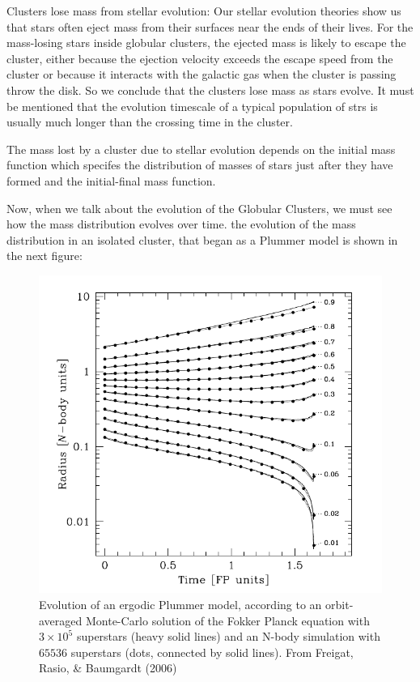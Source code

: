 Clusters lose mass from stellar evolution: Our stellar evolution theories show us that stars often eject mass from their surfaces near the ends of their lives. For the mass-losing stars inside globular clusters, the ejected mass is likely to escape the cluster, either because the ejection velocity exceeds the escape speed from the cluster or because it interacts with the galactic gas when the cluster is passing throw the disk. So we conclude that the clusters lose mass as stars evolve. It must be mentioned that the evolution timescale of a typical population of strs is usually much longer than the crossing time in the cluster.

The mass lost by a cluster due to stellar evolution depends on the initial mass function  which specifes the distribution of masses of stars just after they have formed and the initial-final mass function. 

Now, when we talk about the evolution of the Globular Clusters, we must see how the mass distribution evolves over time. the evolution of the mass distribution in an isolated cluster, that began as a Plummer model is shown in the next figure:

\begin{figure}[H]
\centering
\includegraphics[width=12cm]{images/core_collapse.png}
\caption[Evolution of an ergodic Plummer model over time]{Evolution of an ergodic Plummer model, according to an orbit-averaged Monte-Carlo solution of the Fokker Planck equation with $3\times10^{5}$ superstars (heavy solid lines) and an N-body simulation with $65536$ superstars (dots, connected by solid lines). From Freigat, Rasio, \& Baumgardt (2006)}
\end{figure}

